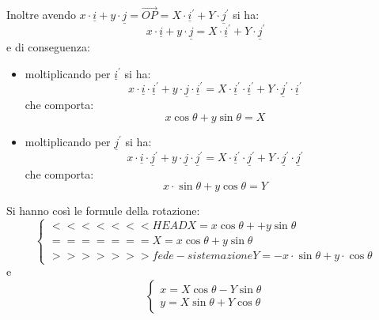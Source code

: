\documentclass[a4paper,12pt, oneside]{book}
\begin{document}
Inoltre avendo $x\cdot \underline{i}+y\cdot \underline{j}=\vec{OP}=X\cdot \underline{i}^{'}+Y\cdot \underline{j}^{'}$ si ha:
$$x\cdot \underline{i}+y\cdot \underline{j}=X\cdot \underline{i}^{'}+Y\cdot \underline{j}^{'}$$
e di conseguenza:
\begin{itemize}
\item moltiplicando per $\underline{i}^{'}$ si ha:
$$x\cdot \underline{i}\cdot \underline{i}^{'}+y\cdot \underline{j}\cdot \underline{i}^{'}=X\cdot \underline{i}^{'}\cdot \underline{i}^{'}+Y\cdot \underline{j}^{'}\cdot \underline{i}^{'}$$
che comporta:
$$x\cos \theta+y\sin\theta=X$$
\item moltiplicando per $\underline{j}^{'}$ si ha:
$$x\cdot \underline{i}\cdot \underline{j}^{'}+y\cdot \underline{j}\cdot \underline{j}^{'}=X\cdot \underline{i}^{'}\cdot \underline{j}^{'}+Y\cdot \underline{j}^{'}\cdot \underline{j}^{'}$$
che comporta:
$$x\cdot \sin\theta+y\cos\theta=Y$$
\end{itemize}
Si hanno così le formule della rotazione:
$$\begin{cases}
<<<<<<< HEAD
X=x\cos \theta++y\sin\theta\\
=======
X=x\cos \theta +y\sin\theta\\
>>>>>>> fede-sistemazione
Y=-x\cdot\sin\theta+y\cdot \cos\theta
\end{cases}$$
e
$$\begin{cases}
x=X\cos\theta-Y\sin\theta\\
y=X\sin\theta+Y\cos\theta
\end{cases}
$$
\end{document}
